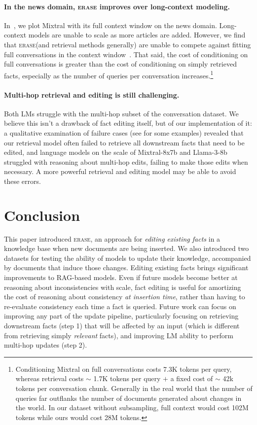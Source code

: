 \documentclass[11pt]{article}
\newcommand{\ourmethod}{\textsc{erase}\xspace}
\begin{document}
\paragraph{In the news domain, \ourmethod improves over long-context modeling.} 
In~, we plot Mixtral with its full context window on the news domain. Long-context models are unable to scale as more articles are added. However, we find that \ourmethod (and retrieval methods generally) are unable to compete against fitting full conversations in the context window~. That said, the cost of conditioning on full conversations is greater than the cost of conditioning on simply retrieved facts, especially as the number of queries per conversation increases.\footnote{Conditioning Mixtral on full conversations costs 7.3K tokens per query, whereas retrieval costs $\sim$ 1.7K tokens per query $+$ a fixed cost of $\sim$ 42k tokens per conversation chunk. Generally in the real world that the number of queries far outflanks the number of documents generated about changes in the world. In our dataset without subsampling, full context would cost 102M tokens while ours would cost 28M tokens.}

\paragraph{Multi-hop retrieval and editing is still challenging.}
Both LMs struggle with the multi-hop subset of the conversation dataset.
We believe this isn't a drawback of fact editing itself, but of our implementation of it: a qualitative examination of failure cases (see  for some examples) revealed that 
our retrieval model often failed to retrieve all downstream facts that need to be edited,
and language models on the scale of Mixtral-8x7b and Llama-3-8b struggled with reasoning about multi-hop edits, failing to make those edits when necessary.
A more powerful retrieval and editing model may be able to avoid these errors.





\section{Conclusion}
This paper introduced \ourmethod, an approach for \textit{editing existing facts} in a knowledge base when new documents are being inserted. We also introduced two datasets for testing the ability of models to update their knowledge, accompanied by documents that induce those changes. Editing existing facts brings significant improvements to RAG-based models. Even if future models become better at reasoning about inconsistencies with scale, fact editing is useful for amortizing the cost of reasoning about consistency \textit{at insertion time}, rather than having to re-evaluate consistency each time a fact is queried.
Future work can focus on improving any part of the update pipeline, particularly focusing on retrieving downstream facts (step 1) that will be affected by an input (which is different from retrieving simply \textit{relevant} facts), and improving LM ability to perform multi-hop updates (step 2).
\end{document}

